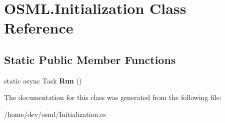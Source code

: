 \hypertarget{classOSML_1_1Initialization}{}\section{O\+S\+M\+L.\+Initialization Class Reference}
\label{classOSML_1_1Initialization}
\subsection*{Static Public Member Functions}
\begin{DoxyCompactItemize}
\item 
\mbox{\label{classOSML_1_1Initialization_a78912998bd93fd6a53627b17c7d36972}} 
static async Task {\bfseries Run} ()
\end{DoxyCompactItemize}


The documentation for this class was generated from the following file\+:\begin{DoxyCompactItemize}
\item 
/home/dev/osml/Initialization.\+cs\end{DoxyCompactItemize}
